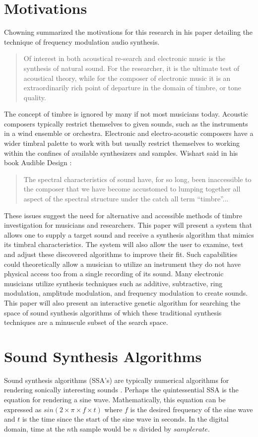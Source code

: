 \documentclass[12pt]{article}
\begin{document}
\section{Motivations}
Chowning summarized the motivations for this research in his paper detailing the technique of frequency modulation audio synthesis.
\begin{quote}
Of interest in both acoustical re-search and electronic music is the synthesis of natural sound. For the researcher, it is the ultimate test of acoustical theory, while for the composer of electronic music it is an extraordinarily rich point of departure in the domain of timbre, or tone quality. \citep{chowning1973synthesis}
\end{quote}
The concept of timbre is ignored by many if not most musicians today. Acoustic composers typically restrict themselves to given sounds, such as the instruments in a wind ensemble or orchestra. Electronic and electro-acoustic composers have a wider timbral palette to work with but usually restrict themselves to working within the confines of available synthesizers and samples. Wishart said in his book Audible Design \citep{wishart1994audible}:
\begin{quote}
The spectral characteristics of sound have, for so long, been inaccessible to the composer that we have become accustomed to lumping together all aspect of the spectral structure under the catch all term ``timbre''...
\end{quote}	 
These issues suggest the need for alternative and accessible methods of timbre investigation for musicians and researchers. This paper will present a system that allows one to supply a target sound and receive a synthesis algorithm that mimics its timbral characteristics. The system will also allow the user to examine, test and adjust these discovered algorithms to improve their fit. Such capabilities could theoretically allow a musician to utilize an instrument they do not have physical access too from a single recording of its sound. Many electronic musicians utilize synthesis techniques such as additive, subtractive, ring modulation, amplitude modulation, and frequency modulation to create sounds. This paper will also present an interactive genetic algorithm for searching the space of sound synthesis algorithms of which these traditional synthesis techniques are a minuscule subset of the search space.

\section{Sound Synthesis Algorithms}\label{SSA}
Sound synthesis algorithms (SSA's) are typically numerical algorithms for rendering sonically interesting sounds \citep{tolonen1998evaluation}. Perhaps the quintessential SSA is the equation for rendering a sine wave. Mathematically, this equation can be expressed as $sin (2 \times \pi \times f \times t)$ where $f$ is the desired frequency of the sine wave and $t$ is the time since the start of the sine wave in seconds. In the digital domain, time at the $n$th sample would be $n$ divided by $sample rate$.
	
\end{document}
